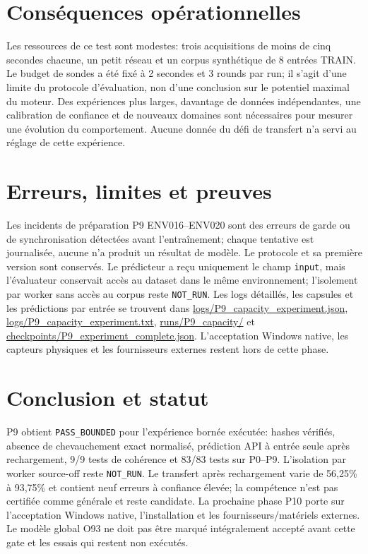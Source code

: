 \documentclass[11pt,a4paper,oneside]{report}
\begin{document}
\section{Conséquences opérationnelles}
Les ressources de ce test sont modestes: trois acquisitions de moins de cinq secondes chacune, un petit réseau et un corpus synthétique de 8 entrées TRAIN. Le budget de sondes a été fixé à 2 secondes et 3 rounds par run; il s'agit d'une limite du protocole d'évaluation, non d'une conclusion sur le potentiel maximal du moteur. Des expériences plus larges, davantage de données indépendantes, une calibration de confiance et de nouveaux domaines sont nécessaires pour mesurer une évolution du comportement. Aucune donnée du défi de transfert n'a servi au réglage de cette expérience.

\section{Erreurs, limites et preuves}
Les incidents de préparation P9 ENV016--ENV020 sont des erreurs de garde ou de synchronisation détectées avant l'entraînement; chaque tentative est journalisée, aucune n'a produit un résultat de modèle. Le protocole et sa première version sont conservés. Le prédicteur a reçu uniquement le champ \texttt{input}, mais l’évaluateur conservait accès au dataset dans le même environnement; l’isolement par worker sans accès au corpus reste \texttt{NOT\_RUN}. Les logs détaillés, les capsules et les prédictions par entrée se trouvent dans \url{logs/P9_capacity_experiment.json}, \url{logs/P9_capacity_experiment.txt}, \url{runs/P9_capacity/} et \url{checkpoints/P9_experiment_complete.json}. L'acceptation Windows native, les capteurs physiques et les fournisseurs externes restent hors de cette phase.

\section{Conclusion et statut}
P9 obtient \texttt{PASS\_BOUNDED} pour l’expérience bornée exécutée: hashes vérifiés, absence de chevauchement exact normalisé, prédiction API à entrée seule après rechargement, 9/9 tests de cohérence et 83/83 tests sur P0--P9. L’isolation par worker source-off reste \texttt{NOT\_RUN}. Le transfert après rechargement varie de 56,25\% à 93,75\% et contient neuf erreurs à confiance élevée; la compétence n'est pas certifiée comme générale et reste candidate. La prochaine phase P10 porte sur l'acceptation Windows native, l'installation et les fournisseurs/matériels externes. Le modèle global O93 ne doit pas être marqué intégralement accepté avant cette gate et les essais qui restent non exécutés.
\end{document}
